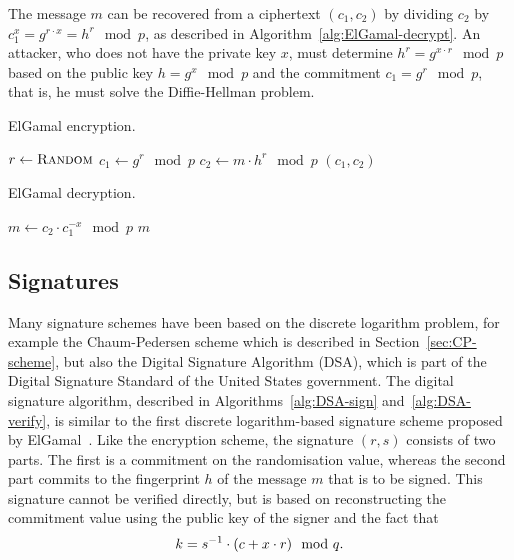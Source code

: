 The message $m$ can be recovered from a ciphertext $(c_1, c_2)$ by dividing
$c_2$ by $c_1^x = g^{r \cdot x} = h^r \mod p$, as described in Algorithm~\ref{alg:ElGamal-decrypt}. An attacker, who does not have
the private key $x$, must determine $h^r = g^{x \cdot r} \mod p$ based on the
public key $h = g^x \mod p$ and the commitment $c_1 = g^r \mod p$, that is, he
must solve the Diffie-Hellman problem.

\begin{algorithm}[t]
  \caption{ElGamal encryption.}
  \label{alg:ElGamal-encrypt}
  \addtolength{\baselineskip}{1mm}
  \begin{algorithmic}[1]
      \State $r \gets \Call{Random}{}$
      \State $c_1 \gets g^r \mod p$
      \State $c_2 \gets m \cdot h^r \mod p$
      \Return $(c_1, c_2)$
    \EndFunction
  \end{algorithmic}
\end{algorithm}
\begin{algorithm}[t]
  \caption{ElGamal decryption.}
  \label{alg:ElGamal-decrypt}
  \addtolength{\baselineskip}{1mm}
  \begin{algorithmic}[1]
      \State $m \gets c_2 \cdot c_1^{-x} \mod p$
      \Return $m$
    \EndFunction
  \end{algorithmic}
\end{algorithm}

\subsection{Signatures}

Many signature schemes have been based on the discrete logarithm problem, for
example the Chaum-Pedersen scheme which is described in
Section~\ref{sec:CP-scheme}, but also the Digital Signature Algorithm (DSA),
which is part of the Digital Signature Standard of the United States government.
The digital signature algorithm, described in Algorithms~\ref{alg:DSA-sign}
and~\ref{alg:DSA-verify}, is similar to the first discrete logarithm-based
signature scheme proposed by ElGamal~\cite{ElGamal1985}. Like the encryption
scheme, the signature $(r, s)$ consists of two parts. The first is a commitment
on the randomisation value, whereas the second part commits to the fingerprint
$h$ of the message $m$ that is to be signed. This signature cannot be verified
directly, but is based on reconstructing the commitment value using the public
key of the signer and the fact that
\begin{equation*}
  k = s^{-1} \cdot (c + x \cdot r) \mod q\text.
\end{equation*}

